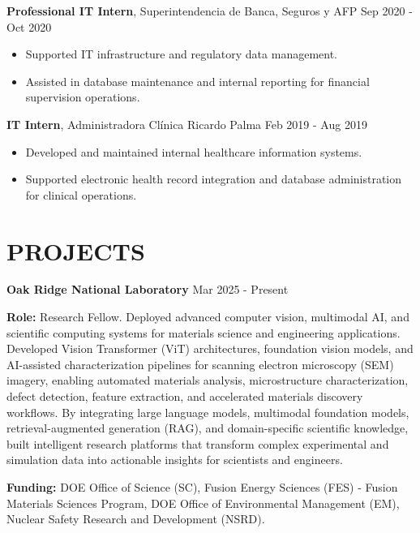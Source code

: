 \documentclass[10pt, letterpaper]{article}
\newenvironment{highlights}{
    \begin{itemize}[
        topsep=0.10 cm,
        parsep=0.10 cm,
        partopsep=0pt,
        itemsep=0pt,
        leftmargin=0 cm + 10pt
    ]
}{
    \end{itemize}
} %
\begin{document}
\vspace{0.2cm}
\noindent\textbf{Professional IT Intern}, Superintendencia de Banca, Seguros y AFP \hfill Sep 2020 - Oct 2020
\begin{highlights}
    \item Supported IT infrastructure and regulatory data management.
    \item Assisted in database maintenance and internal reporting for financial supervision operations.
\end{highlights}

\vspace{0.2cm}
\noindent\textbf{IT Intern}, Administradora Clínica Ricardo Palma \hfill Feb 2019 - Aug 2019
\begin{highlights}
    \item Developed and maintained internal healthcare information systems.
    \item Supported electronic health record integration and database administration for clinical operations.
\end{highlights}

\section{PROJECTS}
\small



\noindent\textbf{Oak Ridge National Laboratory} \hfill Mar 2025 - Present

\noindent\textbf{Role:} Research Fellow. Deployed advanced computer vision, multimodal AI, and scientific computing systems for materials science and engineering applications. Developed Vision Transformer (ViT) architectures, foundation vision models, and AI-assisted characterization pipelines for scanning electron microscopy (SEM) imagery, enabling automated materials analysis, microstructure characterization, defect detection, feature extraction, and accelerated materials discovery workflows. By integrating large language models, multimodal foundation models, retrieval-augmented generation (RAG), and domain-specific scientific knowledge, built intelligent research platforms that transform complex experimental and simulation data into actionable insights for scientists and engineers.

\noindent\textbf{Funding:} DOE Office of Science (SC), Fusion Energy Sciences (FES) - Fusion Materials Sciences Program, DOE Office of Environmental Management (EM), Nuclear Safety Research and Development (NSRD).
\end{document}
